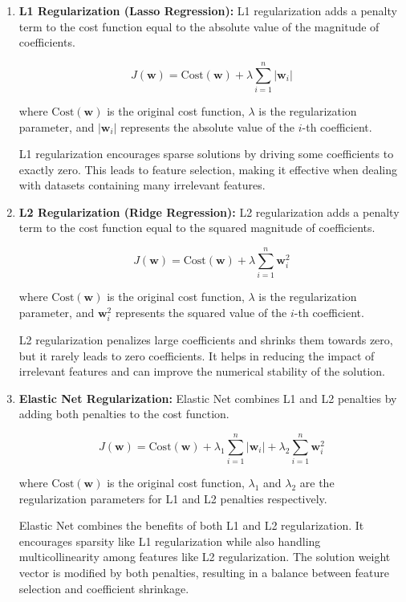 \documentclass[a4paper,10pt,twocolumn]{article}
\begin{document}
\begin{enumerate}[label={}]
\item \textbf{L1 Regularization (Lasso Regression):}
L1 regularization adds a penalty term to the cost function equal to the absolute value of the magnitude of coefficients.

\[ J(\mathbf{w}) = \text{Cost}(\mathbf{w}) + \lambda \sum_{i=1}^{n} |\mathbf{w}_i| \]

where \( \text{Cost}(\mathbf{w}) \) is the original cost function, \( \lambda \) is the regularization parameter, and \( |\mathbf{w}_i| \) represents the absolute value of the \( i \)-th coefficient.

L1 regularization encourages sparse solutions by driving some coefficients to exactly zero. This leads to feature selection, making it effective when dealing with datasets containing many irrelevant features.  \cite{27578920080101}

\item \textbf{L2 Regularization (Ridge Regression):}
 L2 regularization adds a penalty term to the cost function equal to the squared magnitude of coefficients. 
 
 \[ J(\mathbf{w}) = \text{Cost}(\mathbf{w}) + \lambda \sum_{i=1}^{n} \mathbf{w}_i^2 \]
 
where \( \text{Cost}(\mathbf{w}) \) is the original cost function, \( \lambda \) is the regularization parameter, and \( \mathbf{w}_i^2 \) represents the squared value of the \( i \)-th coefficient.

L2 regularization penalizes large coefficients and shrinks them towards zero, but it rarely leads to zero coefficients. It helps in reducing the impact of irrelevant features and can improve the numerical stability of the solution. \cite{27578920080101}

\item \textbf{Elastic Net Regularization:}
Elastic Net combines L1 and L2 penalties by adding both penalties to the cost function.

\[ J(\mathbf{w}) = \text{Cost}(\mathbf{w}) + \lambda_1 \sum_{i=1}^{n} |\mathbf{w}_i| + \lambda_2 \sum_{i=1}^{n} \mathbf{w}_i^2 \]

where \( \text{Cost}(\mathbf{w}) \) is the original cost function, \( \lambda_1 \) and \( \lambda_2 \) are the regularization parameters for L1 and L2 penalties respectively.

Elastic Net combines the benefits of both L1 and L2 regularization. It encourages sparsity like L1 regularization while also handling multicollinearity among features like L2 regularization. The solution weight vector is modified by both penalties, resulting in a balance between feature selection and coefficient shrinkage. \cite{27578920080101}
\end{enumerate}
\end{document}
